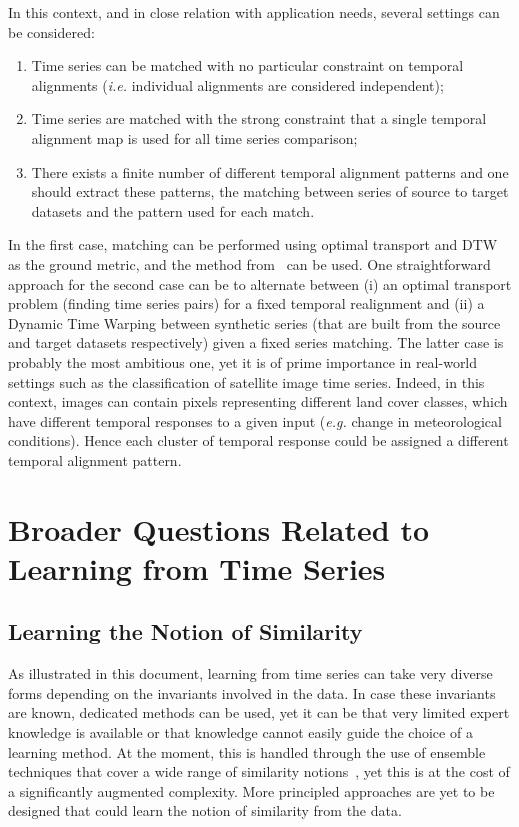 In this context, and in close relation with application needs, several settings
can be considered:

\begin{enumerate}
\item Time series can be matched with no particular constraint on temporal
alignments (\emph{i.e.} individual alignments are considered independent);
\item Time series are matched with the strong constraint that a single temporal
alignment map is used for all time series comparison;
\item There exists a finite number of different temporal alignment patterns and
one should extract these patterns, the matching between series of source
to target datasets and the pattern used for each match.
\end{enumerate}

In the first
case, matching can be performed using optimal transport and DTW as the ground
metric, and the method from~\cite{courty:hal-02112785} can be used.
One straightforward approach for the second case can be to alternate
between (i) an optimal transport
problem (finding time series pairs) for a fixed temporal realignment and (ii) a
Dynamic Time Warping between synthetic series (that are built from the source
and target datasets respectively) given a fixed series matching.
The latter case is probably the most ambitious one, yet it is of prime
importance in real-world settings such as the classification of satellite image
time series.
Indeed, in this context, images can contain pixels representing different land
cover classes, which have different temporal responses to a given input
(\emph{e.g.} change in meteorological conditions).
Hence each cluster of temporal response could be assigned a different temporal
alignment pattern.

\section{Broader Questions Related to Learning from Time Series}

\subsection{Learning the Notion of Similarity}

As illustrated in this document, learning from time series can take very diverse
forms depending on the invariants involved in the data.
In case these invariants are known, dedicated methods can be used, yet it
can be that very limited expert knowledge is available or that knowledge cannot
easily guide the choice of a learning method.
At the moment, this is handled through the use of ensemble techniques that
cover a wide range of similarity notions~\cite{lines2018time},
yet this is at the cost of a significantly augmented complexity.
More principled approaches are yet to be designed that could learn the notion
of similarity from the data.

